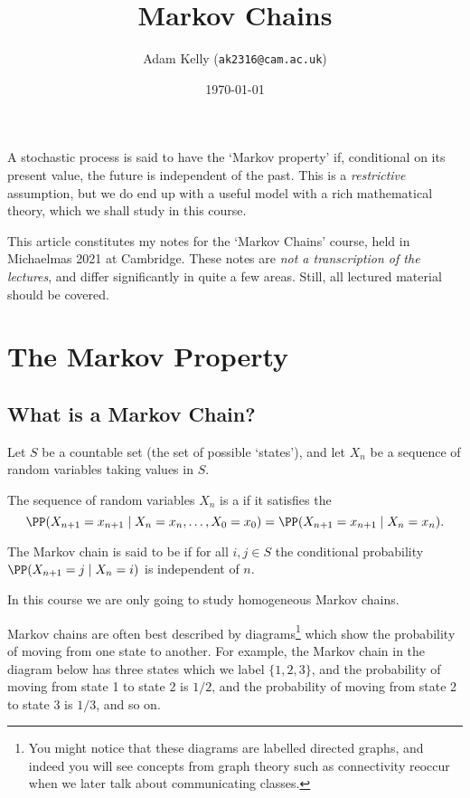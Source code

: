 \documentclass[a4paper]{scrartcl}
\title{Markov Chains}
\author{Adam Kelly (\texttt{ak2316@cam.ac.uk})}
\date{\today}
\begin{document}
\maketitle

A stochastic process is said to have the `Markov property' if, conditional on its present value, the future is independent of the past.
This is a \emph{restrictive} assumption, but we do end up with a useful model with a rich mathematical theory, which we shall study in this course.

This article constitutes my notes for the `Markov Chains' course, held in Michaelmas 2021 at Cambridge. These notes are \emph{not a transcription of the lectures}, and differ significantly in quite a few areas. Still, all lectured material should be covered.


\tableofcontents


\section{The Markov Property}

\subsection{What is a Markov Chain?}

Let $S$ be a countable set (the set of possible `states'), and let $X_n$ be a sequence of random variables taking values in $S$.

\begin{definition}
	The sequence of random variables $X_n$ is a  if it satisfies the 
	$$
	\PP(X_{n + 1} = x_{n + 1} \mid X_n = x_n, \dots, X_0 = x_0) = \PP(X_{n + 1} = x_{n + 1} \mid X_n = x_n).
	$$

	The Markov chain is said to be  if for all $i, j \in S$ the conditional probability $\PP(X_{n + 1} = j \mid X_n = i)$ is independent of $n$.
\end{definition}

In this course we are only going to study homogeneous Markov chains.

Markov chains are often best described by diagrams\footnote{You might notice that these diagrams are labelled directed graphs, and indeed you will see concepts from graph theory such as connectivity reoccur when we later talk about communicating classes.} which show the probability of moving from one state to another.
For example, the Markov chain in the diagram below has three states which we label $\{1, 2, 3\}$, and the probability of moving from state 1 to state 2 is $1/2$, and the probability of moving from state 2 to state 3 is $1/3$, and so on.
\end{document}
